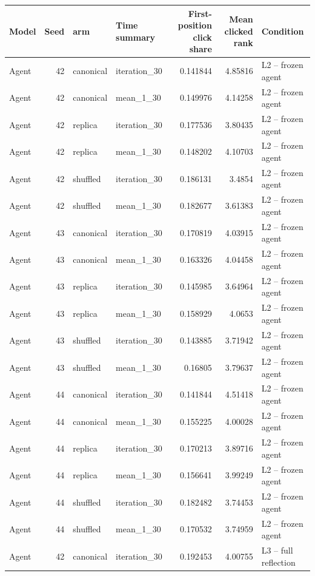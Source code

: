 \begin{table}[htbp!]
\centering
\small
\setlength{\tabcolsep}{3pt}
\renewcommand{\arraystretch}{1.1}
\begin{tabular}{lrllrrl}
\hline
Model & Seed & arm & Time summary & First-position click share & Mean clicked rank & Condition \\
\hline
Agent & 42 & canonical & iteration\_30 & 0.141844 & 4.85816 & L2 -- frozen agent \\
Agent & 42 & canonical & mean\_1\_30 & 0.149976 & 4.14258 & L2 -- frozen agent \\
Agent & 42 & replica & iteration\_30 & 0.177536 & 3.80435 & L2 -- frozen agent \\
Agent & 42 & replica & mean\_1\_30 & 0.148202 & 4.10703 & L2 -- frozen agent \\
Agent & 42 & shuffled & iteration\_30 & 0.186131 & 3.4854 & L2 -- frozen agent \\
Agent & 42 & shuffled & mean\_1\_30 & 0.182677 & 3.61383 & L2 -- frozen agent \\
Agent & 43 & canonical & iteration\_30 & 0.170819 & 4.03915 & L2 -- frozen agent \\
Agent & 43 & canonical & mean\_1\_30 & 0.163326 & 4.04458 & L2 -- frozen agent \\
Agent & 43 & replica & iteration\_30 & 0.145985 & 3.64964 & L2 -- frozen agent \\
Agent & 43 & replica & mean\_1\_30 & 0.158929 & 4.0653 & L2 -- frozen agent \\
Agent & 43 & shuffled & iteration\_30 & 0.143885 & 3.71942 & L2 -- frozen agent \\
Agent & 43 & shuffled & mean\_1\_30 & 0.16805 & 3.79637 & L2 -- frozen agent \\
Agent & 44 & canonical & iteration\_30 & 0.141844 & 4.51418 & L2 -- frozen agent \\
Agent & 44 & canonical & mean\_1\_30 & 0.155225 & 4.00028 & L2 -- frozen agent \\
Agent & 44 & replica & iteration\_30 & 0.170213 & 3.89716 & L2 -- frozen agent \\
Agent & 44 & replica & mean\_1\_30 & 0.156641 & 3.99249 & L2 -- frozen agent \\
Agent & 44 & shuffled & iteration\_30 & 0.182482 & 3.74453 & L2 -- frozen agent \\
Agent & 44 & shuffled & mean\_1\_30 & 0.170532 & 3.74959 & L2 -- frozen agent \\
Agent & 42 & canonical & iteration\_30 & 0.192453 & 4.00755 & L3 -- full reflection \\

\end{tabular}
\end{table}
